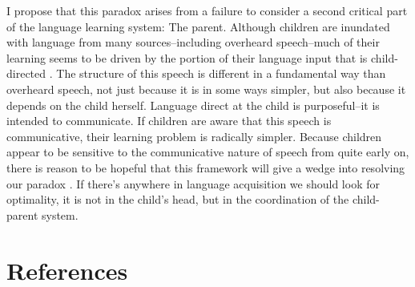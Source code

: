 \documentclass[review]{elsarticle}
\begin{document}
I propose that this paradox arises from a failure to consider a second critical part of the language learning system: The parent. Although children are inundated with language from many sources--including overheard speech--much of their learning seems to be driven by the portion of their language input that is child-directed \cite{weisleder2013}. The structure of this speech is different in a fundamental way than overheard speech, not just because it is in some ways simpler, but also because it depends on the child herself. Language direct at the child is purposeful--it is intended to communicate. If children are aware that this speech is communicative, their learning problem is radically simpler. Because children appear to be sensitive to the communicative nature of speech from quite early on, there is reason to be hopeful that this framework will give a wedge into resolving our paradox \cite{vouloumanos2012,vouloumanos2014}. If there's anywhere in language acquisition we should look for optimality, it is not in the child's head, but in the coordination of the child-parent system.

\section*{References}


\end{document}
